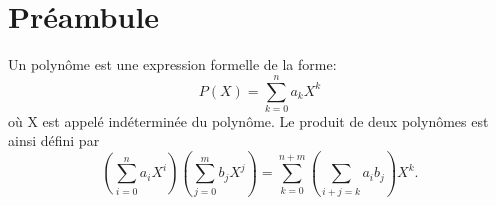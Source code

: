 \documentclass{42}
\begin{document}
\chapter{Préambule}
\begin{flushleft}
Un polynôme est une expression formelle de la forme:
	\begin{equation}
	P(X)=\sum_{k=0}^{n} a_k X^k
	\end{equation}
	où X est appelé indéterminée du polynôme.
	\newline
	\newline
	Le produit de deux polynômes est ainsi défini par
	\begin{equation}
	\left(\sum_{i=0}^n a_iX^i\right)\left(\sum_{j=0}^m b_jX^j\right) = \sum_{k=0}^{n+m} \left(\sum_{i+j = k}a_ib_j\right)X^k.
	\end{equation}
\end{flushleft}
\end{document}
